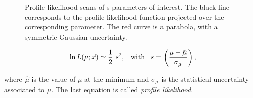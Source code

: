 \begin{figure}[!t]
  \centering
  \begin{subfigure}{0.5\textwidth}
    \raggedright
    \scalebox{0.56}{}
    \caption{}
    \label{nll_ACP0}
  \end{subfigure}%
  \hfill%
  \begin{subfigure}{0.5\textwidth}
    \raggedleft
    \scalebox{0.56}{}
    \caption{}
    \label{nll_ACPperp}
  \end{subfigure}
  \begin{subfigure}{0.5\textwidth}
    \raggedright
    \scalebox{0.56}{}
    \caption{}
    \label{nll_ACPpar}
  \end{subfigure}%
  \hfill%
  \begin{subfigure}{0.5\textwidth}
    \raggedleft
    \scalebox{0.56}{}
    \caption{}
    \label{nll_ACPS}
  \end{subfigure}
\caption{Profile likelihood scans of \Acp{} parameters of interest. The black line corresponds to the profile likelihood
         function projected over the corresponding parameter. The red curve is a parabola, with a symmetric Gaussian
         uncertainty.}
\end{figure}

\begin{equation}
\ln L(\mu;\vec{x}) \simeq \frac{1}{2} \; s^2, \;\;\; \text{with} \;\;\; s = \left( \frac{\mu-\hat{\mu}}{\sigma_{\mu}} \right),
\label{likelihood_exp}
\end{equation}

\noindent where $\hat{\mu}$ is the value of $\mu$ at the minimum and $\sigma_{\mu}$ is the statistical uncertainty associated
to $\mu$. The last equation is called {\it profile likelihood}.

